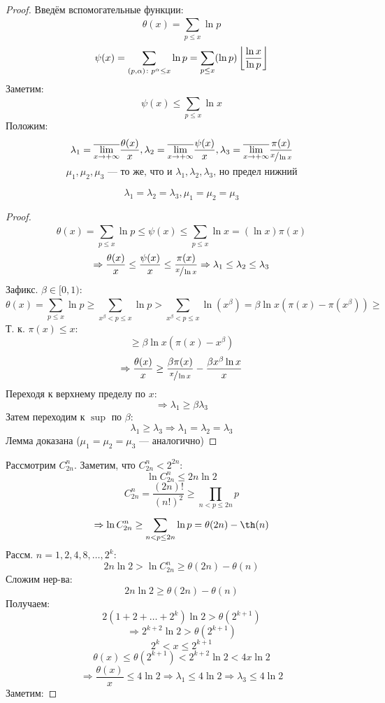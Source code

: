 \begin{proof}
Введём вспомогательные функции:
\[
  \theta(x) = \sum_{p \leq x}^{} \ln p
\]
\[
  \psi(x) = \sum_{(p, \alpha) \colon p ^{\alpha} \leq x}^{} \ln p = \sum_{p \leq x}^{} (\ln p)\left\lfloor  \frac{\ln x}{\ln p} \right\rfloor
\]
Заметим:
\[
  \psi(x) \leq \sum_{p \leq x}^{} \ln x
\]
Положим:
\[
\lambda_1 = \overline{\lim_{x\to +\infty}} \frac{\theta(x)}{x}, \lambda_2 = \overline{\lim_{x\to +\infty}} \frac{\psi(x)}{x}, \lambda_3 = \overline{\lim_{x\to +\infty}} \frac{\pi(x)}{\sfrac{x}{\ln x}}
\]
\[
\mu_1, \mu_2, \mu_3 \text{ --- то же, что и $\lambda_1, \lambda_2, \lambda_3$, но предел нижний}
\]
\begin{lemma}
  \[
  \lambda_1 = \lambda_2 = \lambda_3, \mu_1 = \mu_2 = \mu_3
  \]
\end{lemma}
\begin{proof}
\[
\theta(x) = \sum_{p \leq x}^{} \ln p \leq \psi(x) \leq \sum_{p \leq x}^{} \ln x = (\ln x)\pi(x)
\]
\[
  \Rightarrow \frac{\theta(x)}{x} \leq \frac{\psi(x)}{x} \leq \frac{\pi(x)}{\sfrac{x}{\ln x}} \Rightarrow \lambda_1 \leq \lambda_2 \leq \lambda_3
\]
Зафикс. $\beta \in [0, 1)$:
\[
  \theta(x) = \sum_{p \leq x}^{} \ln p \geq \sum_{x^{\beta} < p \leq x}^{} \ln p > \sum_{x^{\beta} < p \leq x}^{} \ln (x^{\beta}) = \beta \ln x (\pi(x) - \pi(x^{\beta})) \geq 
\]
  Т. к. $\pi(x) \leq x$:
\[
 \geq \beta \ln x (\pi(x) - x^{\beta})
\]
\[
\Rightarrow \frac{\theta(x)}{x} \geq \frac{\beta \pi(x)}{\sfrac{x}{\ln x}} - \frac{\beta x^{\beta} \ln x}{x}
\]
  Переходя к верхнему пределу по $x$:
\[
\Rightarrow \lambda_1 \geq \beta \lambda_3
\]
  Затем переходим к $\sup$ по $\beta$:
  \[
  \lambda_1 \geq \lambda_3 \Rightarrow \lambda_1 = \lambda_2 = \lambda_3
  \]
  Лемма доказана ($\mu_1 = \mu_2 = \mu_3$ --- аналогично)
\end{proof}
Рассмотрим $C_{2n}^{n}$. Заметим, что $C_{2n}^{n} < 2^{2n}$:
\[
  \ln C_{2n}^{n} \leq 2n \ln 2
\]
\[
  C_{2n}^{n} = \frac{(2n)!}{(n!)^{2}} \geq \prod_{n < p \leq 2n} p
\]
\[
\Rightarrow \ln C_{2n}^{n} \geq \sum_{n < p \leq 2n}^{} \ln p = \theta(2n) - \th(n)
\]
Рассм. $n = 1, 2, 4, 8, \ldots, 2^{k}$:
\[
2n\ln 2 > \ln C_{2n}^{n} \geq \theta(2n) - \theta(n)
\]
Сложим нер-ва:
\[
  2n \ln 2 \geq \theta(2n) - \theta(n)
\]
Получаем:
\[
  2(1 + 2 + \ldots + 2^{k})\ln 2 > \theta(2^{k + 1})
\]
\[
  \Rightarrow 2^{k + 2}\ln 2 > \theta(2^{k + 1})
\]
\[
2^{k} < x \leq 2^{k + 1}
\]
\[
\theta(x) \leq \theta(2^{k + 1}) < 2^{k + 2}\ln 2 < 4 x \ln 2
\]
\[
\Rightarrow \frac{\theta(x)}{x} \leq 4\ln 2 \Rightarrow \lambda_1 \leq 4\ln 2 \Rightarrow \lambda_3 \leq 4 \ln 2
\]
Заметим:

\end{proof}
